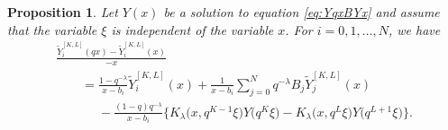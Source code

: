 \documentclass[pdftex]{sigma}
\numberwithin{equation}{section}
\newtheorem{Proposition}[Theorem]{Proposition}
\theoremstyle{definition}
\begin{document}
\begin{Proposition} \label{prop:convKL3}
Let $Y(x)$ be a solution to equation \eqref{eq:YqxBYx} and assume that the variable $\xi $ is independent of the variable $x$.
For $i=0,1,\dots ,N $, we have
\begin{gather}
 \frac{\widetilde{Y}_{i}^{[K,L]}(qx) - \widetilde{Y}_{i}^{[K,L]}(x)}{-x} \nonumber \\
\qquad = \frac{1 - q^{-\lambda } }{x - b_{i}} \widetilde{Y}_{i}^{[K,L]}(x) + \frac{1}{x - b_{i}}\sum^{N}_{j = 0} q^{-\lambda } B_{j} \widetilde{Y}_{j}^{[K,L]}(x) \nonumber \\
 \phantom{\qquad = }{} - \frac{(1-q) q^{-\lambda } }{x - b_{i}} \bigl\{ K_{\lambda}\bigl(x, q^{K-1} \xi\bigr)Y\bigl(q^{K} \xi\bigr) - K_{\lambda}\bigl(x, q^{L} \xi\bigr)Y\bigl(q^{L+1} \xi\bigr) \bigr\}.  \label{eq:wtYiqx3}
\end{gather}
\end{Proposition}
\end{document}

